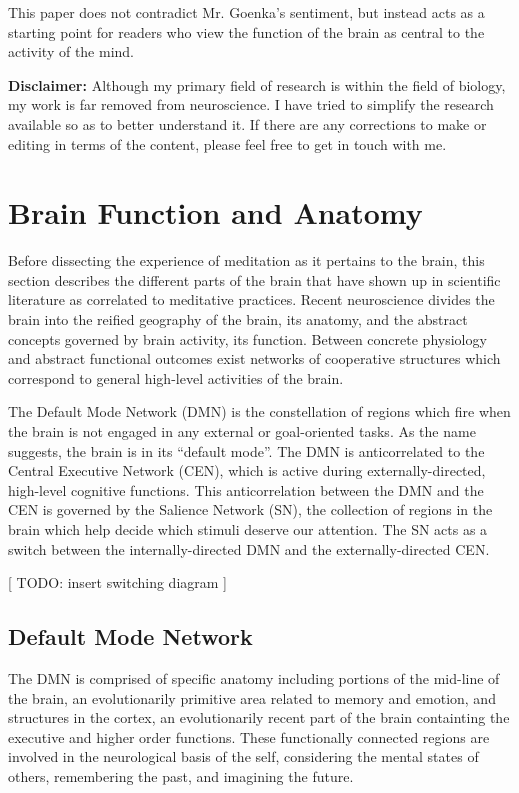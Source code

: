 \documentclass[twocolumn]{article}
\begin{document}
This paper does not contradict Mr. Goenka's sentiment, but instead acts as a starting
point for readers who view the function of the brain as central to the activity of
the mind.

\textbf{Disclaimer:} Although my primary field of research is within the field of
biology, my work is far removed
from neuroscience. I have tried to simplify the research available so as to better
understand it. If there are any corrections to make or editing in terms of the
content, please feel free to get in touch with me.


\section{Brain Function and Anatomy}

Before dissecting the experience of meditation as it pertains to the brain, this
section describes the different parts of the brain that have shown up in
scientific literature as correlated to meditative practices. Recent neuroscience divides the
brain into the reified geography of the brain, its anatomy, and the abstract concepts
governed by brain activity, its function. Between concrete physiology and abstract
functional outcomes exist networks of cooperative structures which correspond to general
high-level activities of the brain.

The Default Mode Network (DMN) is the constellation of regions which fire when
the brain is not engaged in any external or goal-oriented
tasks. As the name suggests, the brain is in its ``default
mode''. \cite{defaultnetworkadaptive} The DMN is anticorrelated to the Central Executive
Network (CEN), which is active during externally-directed, high-level cognitive
functions. \cite{saliencenetwork} This anticorrelation between the DMN and the CEN is
governed by the Salience Network (SN), the collection of regions in the brain which
help decide which stimuli deserve our attention. The SN acts as a switch between the
internally-directed DMN and the externally-directed CEN. \cite{saliencenetwork}

[ TODO: insert switching diagram ]


\subsection{Default Mode Network}

The DMN is comprised of specific anatomy including portions of the mid-line of the
brain, an evolutionarily primitive area related to memory and emotion, and
structures in the cortex, an evolutionarily recent part of the brain containting the
executive and higher order functions. \cite{defaultnetworkanatomy} These functionally
connected regions are involved in the neurological basis
of the self, considering the mental states of others, remembering the past, and
imagining the future.
\end{document}
